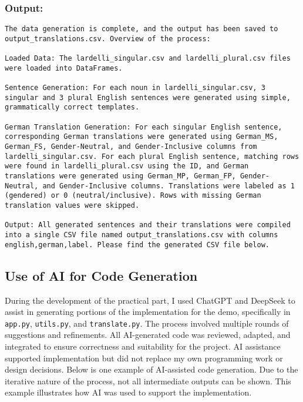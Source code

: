 \subsubsection{Output: } 
\begin{lstlisting}
The data generation is complete, and the output has been saved to output_translations.csv. Overview of the process:

Loaded Data: The lardelli_singular.csv and lardelli_plural.csv files were loaded into DataFrames.

Sentence Generation: For each noun in lardelli_singular.csv, 3 singular and 3 plural English sentences were generated using simple, grammatically correct templates.

German Translation Generation: For each singular English sentence, corresponding German translations were generated using German_MS, German_FS, Gender-Neutral, and Gender-Inclusive columns from lardelli_singular.csv. For each plural English sentence, matching rows were found in lardelli_plural.csv using the ID, and German translations were generated using German_MP, German_FP, Gender-Neutral, and Gender-Inclusive columns. Translations were labeled as 1 (gendered) or 0 (neutral/inclusive). Rows with missing German translation values were skipped.

Output: All generated sentences and their translations were compiled into a single CSV file named output_translations.csv with columns english,german,label. Please find the generated CSV file below.

\end{lstlisting}

\subsection{Use of AI for Code Generation}\label{appendix:ai_code}
During the development of the practical part, I used ChatGPT and DeepSeek to assist in generating portions of the implementation for the demo, specifically in \texttt{app.py}, \texttt{utils.py}, and \texttt{translate.py}. The process involved multiple rounds of suggestions and refinements. All AI-generated code was reviewed, adapted, and integrated to ensure correctness and suitability for the project. AI assistance supported implementation but did not replace my own programming work or design decisions. Below is one example of AI-assisted code generation. Due to the iterative nature of the process, not all intermediate outputs can be shown. This example illustrates how AI was used to support the implementation.


